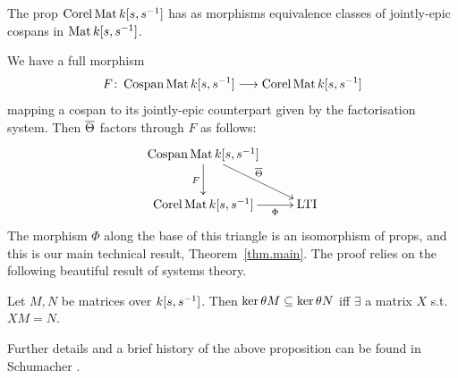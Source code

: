 \begin{definition}
  The prop $\operatorname{{Corel}} \operatorname{\mathrm{Mat}} {k[s,s^{-1}]}$ has as morphisms equivalence classes of
  jointly-epic cospans in $\operatorname{\mathrm{Mat}}{k[s,s^{-1}]}$.  
\end{definition}

We have a full morphism
\[
  F{\colon} \operatorname{{Cospan}} \operatorname{\mathrm{Mat}} {k[s,s^{-1}]} \longrightarrow \operatorname{{Corel}} \operatorname{\mathrm{Mat}} {k[s,s^{-1}]}
\]
mapping a cospan to its jointly-epic counterpart given by the
 factorisation system. %
Then $\overline{\Theta}$
factors through $F$ as follows:
\[
  \xymatrixrowsep{2pc}
  \xymatrix{
    \cospan\mat\pk \ar[d]_F \ar[dr]^{\cospanfunrest} \\
    \corel\mat\pk \ar[r]_-{\Phi} & \ltids
  }
\]
The morphism $\Phi$ along the base of this triangle is an isomorphism of props, 
and this is our main technical result, Theorem~\ref{thm.main}. The proof relies
on the following beautiful result of systems theory.

\begin{proposition} \label{prop.magic}
  Let $M,N$ be matrices over ${k[s,s^{-1}]}$. Then $\ker \theta M \subseteq \ker \theta N$ iff $\exists$ a matrix $X$ s.t.\ $XM = N$.
\end{proposition}

Further details and a brief history of the above proposition can be found in
Schumacher \cite[pp.7--9]{Sc}. 

